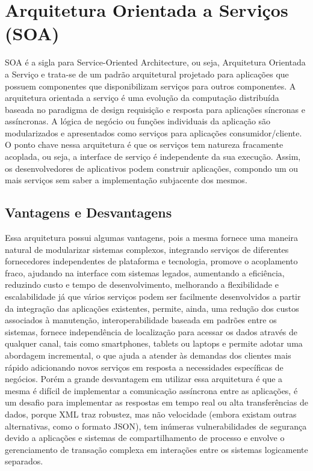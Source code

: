\documentclass[12pt]{article}
\begin{document}
\section{Arquitetura Orientada a Serviços (SOA)} 

SOA é a sigla para Service-Oriented Architecture, ou seja, Arquitetura Orientada a Serviço e trata-se de um padrão arquitetural projetado para aplicações que possuem componentes que disponibilizam serviços para outros componentes.
A arquitetura orientada a serviço é uma evolução da computação distribuída baseada no paradigma de design requisição e resposta para aplicações síncronas e assíncronas.  A lógica de negócio ou funções individuais da aplicação são modularizados e apresentados como serviços para aplicações consumidor/cliente.
O ponto chave nessa arquitetura é que os serviços tem natureza fracamente acoplada, ou seja, a interface de serviço é independente  da sua execução. Assim, os desenvolvedores de aplicativos podem construir aplicações, compondo um ou mais serviços sem saber a implementação subjacente dos mesmos.



\subsection{Vantagens e Desvantagens}

Essa arquitetura possui algumas vantagens, pois a mesma fornece uma maneira natural de modularizar sistemas complexos, integrando serviços de diferentes fornecedores independentes de plataforma e tecnologia, promove o acoplamento fraco, ajudando na  interface com sistemas legados, aumentando a eficiência, reduzindo custo e tempo de desenvolvimento, melhorando a flexibilidade e escalabilidade já que  vários serviços podem ser facilmente desenvolvidos a partir da integração das aplicações existentes, permite, ainda, uma redução dos custos associados à manutenção, interoperabilidade baseada em padrões entre os sistemas, fornece independência de localização para acessar os dados através de qualquer canal, tais como smartphones, tablets ou laptops e permite adotar uma abordagem incremental, o que ajuda a atender às demandas dos clientes mais rápido adicionando novos serviços em resposta a necessidades específicas de negócios. 
Porém a grande desvantagem em utilizar essa arquitetura é que a mesma é difícil de implementar a comunicação assíncrona entre as aplicações, é um desafio para implementar as respostas em tempo real ou alta transferências de dados, porque XML traz robustez, mas não velocidade (embora existam outras alternativas, como o formato JSON), tem inúmeras vulnerabilidades de segurança devido a aplicações e sistemas de compartilhamento de processo e envolve o gerenciamento de transação complexa em interações entre os sistemas logicamente separados.
\end{document}
